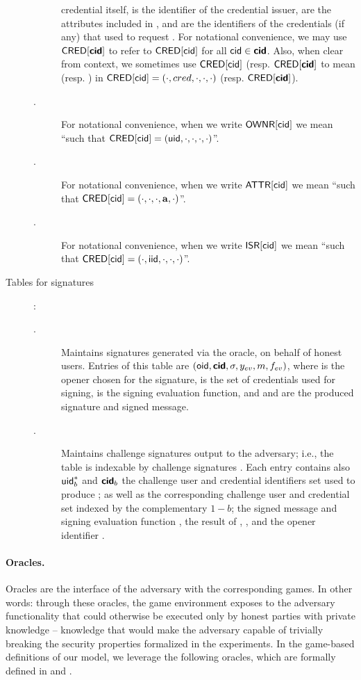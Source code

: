 \begin{description}
\begin{description}
    credential itself, \iid is the identifier of the credential issuer, \attrs
    are the attributes included in \cred, and \scid are the identifiers of the
    credentials (if any) that \uid used to request \cred. For notational
    convenience, we may use $\mathsf{CRED}[\boldsymbol{\mathsf{cid}}]$ to refer to $\mathsf{CRED}[\mathsf{cid}]$ for all
    $\mathsf{cid} \in \boldsymbol{\mathsf{cid}}$. Also, when clear from context, we sometimes use
    $\mathsf{CRED}[\mathsf{cid}]$ (resp. $\mathsf{CRED}[\boldsymbol{\mathsf{cid}}]$ to mean \cred (resp. \scred) in
    $\mathsf{CRED}[\mathsf{cid}] = (\cdot,cred,\cdot,\cdot,\cdot)$ (resp. $\mathsf{CRED}[\boldsymbol{\mathsf{cid}}]$).
  \item[\OWNR.] For notational convenience, when we write $\mathsf{OWNR}[\mathsf{cid}]$ we mean
    ``\uid such that $\mathsf{CRED}[\mathsf{cid}] = (\mathsf{uid}, \cdot, \cdot, \cdot, \cdot)$''.
  \item[\ATTR.] For notational convenience, when we write $\mathsf{ATTR}[\mathsf{cid}]$ we mean
    ``\attrs such that $\mathsf{CRED}[\mathsf{cid}] = (\cdot, \cdot, \cdot, \mathbf{a}, \cdot)$''.
  \item[\ISR.] For notational convenience, when we write $\mathsf{ISR}[\mathsf{cid}]$ we mean
    ``\iid such that $\mathsf{CRED}[\mathsf{cid}] = (\cdot, \mathsf{iid}, \cdot, \cdot, \cdot)$''.
  \end{description}
\item[Tables for signatures]:
  \begin{description}
  \item[\SIG.] Maintains signatures generated via the \SIGN oracle, on behalf
    of honest users. Entries of this table are $(\mathsf{oid},\boldsymbol{\mathsf{cid}},\sigma,y_{ev},m,
    f_{ev})$, where \oid is the opener chosen for the signature, \scid is the
    set of credentials used for signing, \feval is the signing evaluation
    function, and \sig and \msg are the produced signature and signed message.
  \item[\CSIG.] Maintains challenge signatures output to the adversary; i.e.,
    the table is indexable by challenge signatures \csig.
    Each entry contains also $\mathsf{uid}^*_b$ and $\boldsymbol{\mathsf{cid}}_b$ the challenge user and
    credential identifiers set used to produce \csig; as well as the
    corresponding challenge user and credential set indexed by the complementary
    $1-b$; the signed message \msg and signing evaluation function \feval, the
    result of \feval, \yeval, and the opener identifier \oid.
  \end{description}
\end{description}

\paragraph{Oracles.} %
Oracles are the interface of the adversary with the corresponding games. In
other words: through these oracles, the game environment exposes to the adversary
functionality that could otherwise be executed only by honest parties with
private knowledge -- knowledge that would make the adversary capable of
trivially breaking the security properties formalized in the experiments.
In the game-based definitions of our \UAS model, we leverage the following
oracles, which are formally defined in  and
. 

